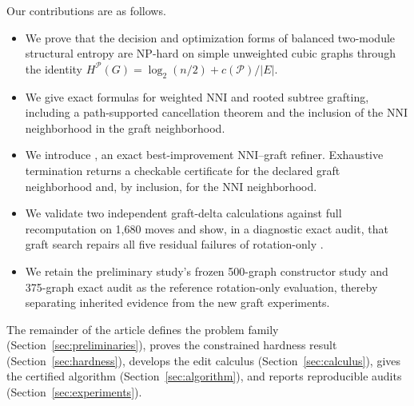 Our contributions are as follows.
\begin{itemize}
  \item We prove that the decision and optimization forms of balanced
  two-module structural entropy are NP-hard on simple unweighted cubic graphs
  through the identity
  $H^{\mathcal P}(G)=\log_2(n/2)+c(\mathcal P)/|E|$.
  \item We give exact formulas for weighted NNI and rooted subtree grafting,
  including a path-supported cancellation theorem and the inclusion of the
  NNI neighborhood in the graft neighborhood.
  \item We introduce \GNEST, an exact best-improvement NNI--graft refiner.
  Exhaustive termination returns a checkable certificate for the declared
  graft neighborhood and, by inclusion, for the NNI neighborhood.
  \item We validate two independent graft-delta calculations against full
  recomputation on 1,680 moves and show, in a diagnostic exact audit, that
  graft search repairs all five residual failures of rotation-only \NEST.
  \item We retain the preliminary study's frozen 500-graph constructor study
  and 375-graph exact audit as the reference rotation-only evaluation, thereby
  separating inherited evidence from the new graft experiments.
\end{itemize}

The remainder of the article defines the problem family
(Section~\ref{sec:preliminaries}), proves the constrained hardness result
(Section~\ref{sec:hardness}), develops the edit calculus
(Section~\ref{sec:calculus}), gives the certified algorithm
(Section~\ref{sec:algorithm}), and reports reproducible audits
(Section~\ref{sec:experiments}).
